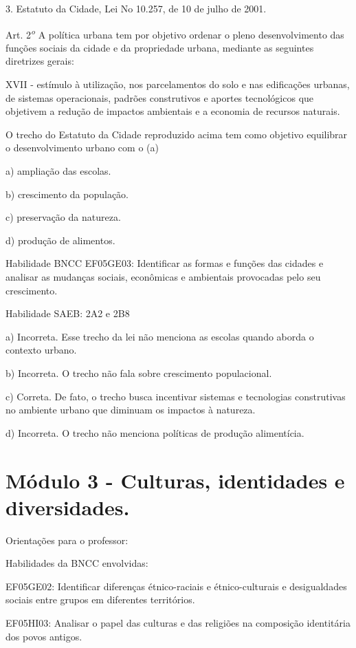 3. Estatuto da Cidade, Lei No 10.257, de 10 de julho de 2001.

Art. 2\textsuperscript{\emph{o}} A política urbana tem por objetivo
ordenar o pleno desenvolvimento das funções sociais da cidade e da
propriedade urbana, mediante as seguintes diretrizes gerais:

XVII - estímulo à utilização, nos parcelamentos do solo e nas
edificações urbanas, de sistemas operacionais, padrões construtivos e
aportes tecnológicos que objetivem a redução de impactos ambientais e a
economia de recursos naturais.

O trecho do Estatuto da Cidade reproduzido acima tem como objetivo
equilibrar o desenvolvimento urbano com o (a)

a) ampliação das escolas.

b) crescimento da população.

c) preservação da natureza.

d) produção de alimentos.

Habilidade BNCC EF05GE03: Identificar as formas e funções das cidades e
analisar as mudanças sociais, econômicas e ambientais provocadas pelo
seu crescimento.

Habilidade SAEB: 2A2 e 2B8

a) Incorreta. Esse trecho da lei não menciona as escolas quando aborda o
contexto urbano.

b) Incorreta. O trecho não fala sobre crescimento populacional.

c) Correta. De fato, o trecho busca incentivar sistemas e tecnologias
construtivas no ambiente urbano que diminuam os impactos à natureza.

d) Incorreta. O trecho não menciona políticas de produção alimentícia.

\section{Módulo 3 - Culturas, identidades e
diversidades.}\label{muxf3dulo-3---culturas-identidades-e-diversidades.}

Orientações para o professor:

Habilidades da BNCC envolvidas:

EF05GE02: Identificar diferenças étnico-raciais e étnico-culturais e
desigualdades sociais entre grupos em diferentes territórios.

EF05HI03: Analisar o papel das culturas e das religiões na composição
identitária dos povos antigos.

